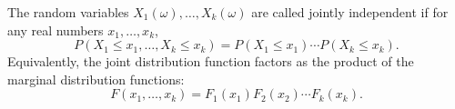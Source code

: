 The random variables $X_1(\omega), \ldots, X_k(\omega)$ are called jointly independent if for any real numbers $x_1, \ldots, x_k$,
$$P(X_1 \leq x_1, \ldots, X_k \leq x_k) = P(X_1 \leq x_1) \cdots P(X_k \leq x_k).$$
Equivalently, the joint distribution function factors as the product of the marginal distribution functions:
$$F(x_1, \ldots, x_k) = F_1(x_1) F_2(x_2) \cdots F_k(x_k).$$
